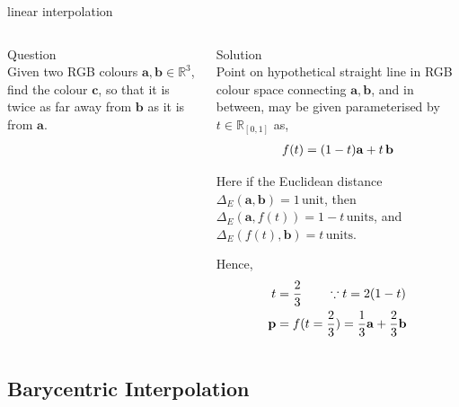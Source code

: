 \documentclass[aspectratio=169,xcolor={dvipsnames,svgnames}]{beamer}
\begin{document}
\begin{frame}[label={sec:org40e1bea}]{linear interpolation}
\begin{columns}
\begin{column}{.3\columnwidth}
\alert{Question} \\[0pt]
Given two RGB colours \(\mathbf{a},\mathbf{b} \in
\mathbb{R}^3\), find the colour \(\mathbf{c}\), so that it
is twice as far away from \(\mathbf{b}\) as it is from
\(\mathbf{a}\).
\end{column}

\begin{column}{.7\columnwidth}
\alert{Solution} \\[0pt]
Point on hypothetical straight line in RGB colour space
connecting \(\mathbf{a},\mathbf{b}\), and in between, may
be given parameterised by \(t\in\mathbb{R}_{[0,1]}\) as,
\begin{align}
  \notag
  f(t) = (1-t)\mathbf{a} + t\,\mathbf{b}
\end{align}

Here if the Euclidean distance \(\Delta_E (\mathbf{a},
\mathbf{b}) = 1\,\mathrm{unit}\), then \(\Delta_E
(\mathbf{a}, f(t)) = 1-t\,\mathrm{units}\), and
\(\Delta_E (f(t), \mathbf{b}) = t\,\mathrm{units}\).

Hence,
\begin{align}
  \notag
  t &= \frac23 \qquad \because t = 2(1-t) \\
  \notag
  \mathbf{p} &= f(t=\frac23) =
               \frac13\mathbf{a} + \frac23\mathbf{b}
\end{align}
\end{column}
\end{columns}
\end{frame}





\subsection{Barycentric Interpolation}
\label{sec:org98b3d48}
\end{document}
